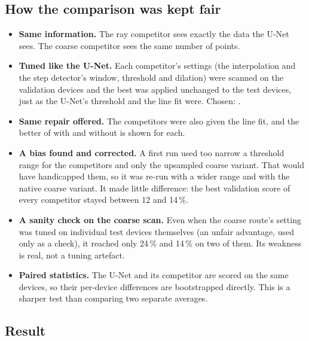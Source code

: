 \documentclass[10pt,a4paper]{article}
\begin{document}
\subsection{How the comparison was kept fair}
\begin{itemize}
\item \textbf{Same information.}  The ray competitor sees exactly the data
  the U-Net sees.  The coarse competitor sees the same number of points.
\item \textbf{Tuned like the U-Net.}  Each competitor's settings (the
  interpolation and the step detector's window, threshold and dilation) were
  scanned on the validation devices and the best was applied unchanged to
  the test devices, just as the U-Net's threshold and the line fit were.
  Chosen: \emph{\vEqChosen}.
\item \textbf{Same repair offered.}  The competitors were also given the
  line fit, and the better of with and without is shown for each.
\item \textbf{A bias found and corrected.}  A first run used too narrow a
  threshold range for the competitors and only the upsampled coarse
  variant.  That would have handicapped them, so it was re-run with a wider
  range and with the native coarse variant.  It made little difference: the
  best validation score of every competitor stayed between 12 and 14\,\%.
\item \textbf{A sanity check on the coarse scan.}  Even when the coarse
  route's setting was tuned on individual test devices themselves (an
  unfair advantage, used only as a check), it reached only 24\,\% and
  14\,\% on two of them.  Its weakness is real, not a tuning artefact.
\item \textbf{Paired statistics.}  The U-Net and its competitor are scored
  on the same devices, so their per-device differences are bootstrapped
  directly.  This is a sharper test than comparing two separate averages.
\end{itemize}

\subsection{Result}

\begin{table}[H]
\centering
\caption{Few-electron balanced accuracy (\%), \vNTest{} test devices, every
budget.  ``Best competitor'': the best of the six conventional variants at
that budget (chosen with hindsight on the test set, which favours the
competitor).  Difference: U-Net + fit minus best competitor, mean over
devices, with a paired 95\,\% bootstrap interval.}
\label{tab:equal}
\small

\end{table}
\end{document}
